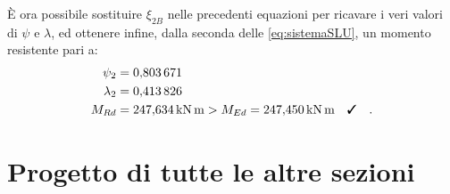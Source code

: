 È ora possibile sostituire $\xi_{2B}$ nelle precedenti equazioni per ricavare i veri valori di $\psi$ e $\lambda$, ed ottenere infine, dalla seconda delle \ref{eq:sistemaSLU}, un momento resistente pari a:
\begin{equation}
  \begin{split}
    \psi_{2} &= \num{0.803671}\\
    \lambda_{2} &= \num{0.413826}\\
    M_{Rd} &= \SI{247.634}{\kilo\newton\metre} > M_{Ed} = \SI{247.450}{\kilo\newton\metre} \quad \checked \quad .
  \end{split}
\end{equation}

\section{Progetto di tutte le altre sezioni}
